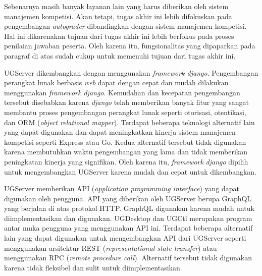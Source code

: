 \par Sebenarnya masih banyak layanan lain yang harus diberikan oleh sistem manajemen kompetisi. Akan tetapi, tugas akhir ini lebih difokuskan pada pengembangan \textit{autograder} dibandingkan dengan sistem manajemen kompetisi. Hal ini dikarenakan tujuan dari tugas akhir ini lebih berfokus pada proses penilaian jawaban peserta. Oleh karena itu, fungsionalitas yang dipaparkan pada paragraf di atas sudah cukup untuk memenuhi tujuan dari tugas akhir ini.

\par UGServer dikembangkan dengan menggunakan \textit{framework django}. Pengembangan perangkat lunak berbasis \textit{web} dapat dengan cepat dan mudah dilakukan menggunakan \textit{framework django}. Kemudahan dan kecepatan pengembangan tersebut disebabkan karena \textit{django} telah memberikan banyak fitur yang sangat membantu proses pengembangan perangkat lunak seperti otorisasi, otentikasi, dan ORM (\textit{object relational mapper}). Terdapat beberapa teknologi alternatif lain yang dapat digunakan dan dapat meningkatkan kinerja sistem manajemen kompetisi seperti Express atau Go. Kedua alternatif tersebut tidak digunakan karena membutuhkan waktu pengembangan yang lama dan tidak memberikan peningkatan kinerja yang signifikan. Oleh karena itu, \textit{framework} \textit{django} dipilih untuk mengembangkan UGServer karena mudah dan cepat untuk dikembangkan.

\par UGServer memberikan API (\textit{application programming interface}) yang dapat digunakan oleh pengguna. API yang diberikan oleh UGServer berupa GraphQL yang berjalan di atas protokol HTTP. GraphQL digunakan karena mudah untuk diimplementasikan dan digunakan. UGDesktop dan UGCtl merupakan program antar muka pengguna yang menggunakan API ini. Terdapat beberapa alternatif lain yang dapat digunakan untuk mengembangkan API dari UGServer seperti menggunakan arsitektur REST (\textit{representational state transfer}) atau menggunakan RPC (\textit{remote procedure call}). Alternatif tersebut tidak digunakan karena tidak fleksibel dan sulit untuk diimplementasikan.

